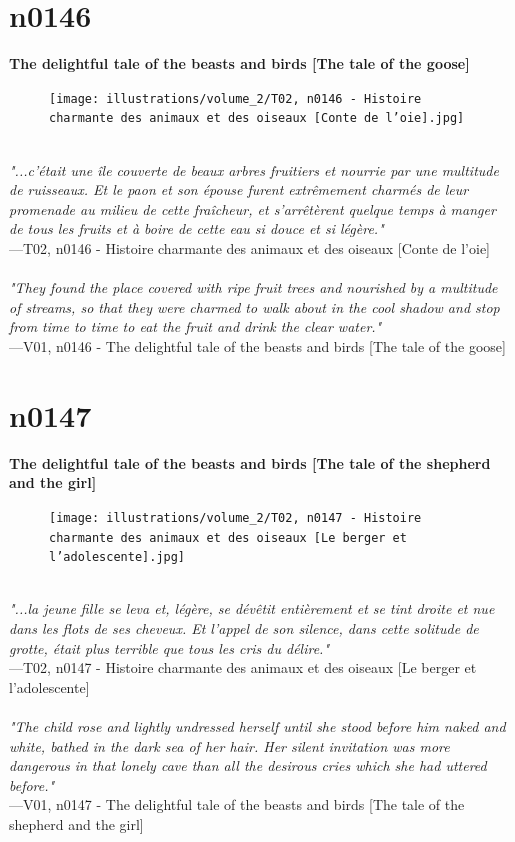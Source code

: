 \documentclass[../Carre_nights.tex]{subfiles}
\begin{document}
\newpage

\section{n0146}
\textbf{\Large{The delightful tale of the beasts and birds [The tale of the goose]}} \\

\begin{figure}[ht]
\centering
\texttt{[image: illustrations/volume\_2/T02, n0146 - Histoire charmante des animaux et des oiseaux [Conte de l’oie].jpg]}
\end{figure}

\textit{\\
"...c’était une île couverte de beaux arbres fruitiers et nourrie par une multitude de ruisseaux. Et le paon et son épouse furent extrêmement charmés de leur promenade au milieu de cette fraîcheur, et s’arrêtèrent quelque temps à manger de tous les fruits et à boire de cette eau si douce et si légère."} \\
—T02, n0146 - Histoire charmante des animaux et des oiseaux [Conte de l’oie] \\~\\
\textit{"They found the place covered with ripe fruit trees and nourished by a multitude of streams, so that they were charmed to walk about in the cool shadow and stop from time to time to eat the fruit and drink the clear water."} \\
—V01, n0146 - The delightful tale of the beasts and birds [The tale of the goose]

\newpage

\section{n0147}
\textbf{\Large{The delightful tale of the beasts and birds [The tale of the shepherd and the girl]}} \\

\begin{figure}[ht]
\centering
\texttt{[image: illustrations/volume\_2/T02, n0147 - Histoire charmante des animaux et des oiseaux [Le berger et l’adolescente].jpg]}
\end{figure}

\textit{\\
"...la jeune fille se leva et, légère, se dévêtit entièrement et se tint droite et nue dans les flots de ses cheveux. Et l’appel de son silence, dans cette solitude de grotte, était plus terrible que tous les cris du délire."} \\
—T02, n0147 - Histoire charmante des animaux et des oiseaux [Le berger et l’adolescente] \\~\\
\textit{"The child rose and lightly undressed herself until she stood before him naked and white, bathed in the dark sea of her hair. Her silent invitation was more dangerous in that lonely cave than all the desirous cries which she had uttered before."} \\
—V01, n0147 - The delightful tale of the beasts and birds [The tale of the shepherd and the girl]
\end{document}
